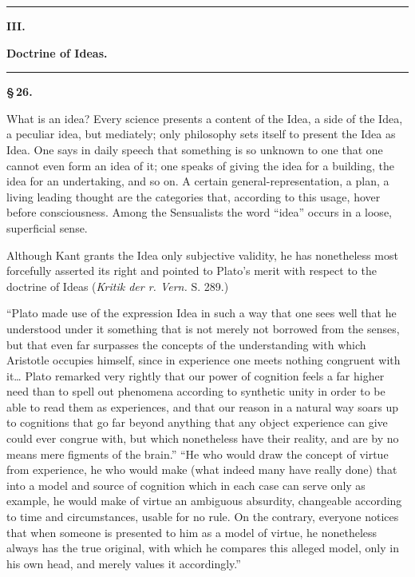 \documentclass[12pt]{book}
\begin{document}
\begin{center}\rule{0.35\linewidth}{0.4pt}\end{center}
\begin{center}
  {\large\bfseries III.}\par\vspace{4pt}
  {\Large\bfseries Doctrine of Ideas.}\par\vspace{4pt}
  \rule{2.5cm}{0.4pt}
\end{center}
{}

\begin{center}{\bfseries \S\,26.}\end{center}

What is an idea? Every science presents a content of the Idea, a side of the Idea, a peculiar
idea, but mediately; only philosophy sets itself to present the Idea as Idea. One says in daily
speech that something is so unknown to one that one cannot even form an idea of it; one speaks of
giving the idea for a building, the idea for an undertaking, and so on. A certain
general-representation, a plan, a living leading thought are the categories that, according to
this usage, hover before consciousness. Among the Sensualists the word ``idea'' occurs in a loose,
superficial sense.

Although Kant grants the Idea only subjective validity, he has nonetheless most forcefully
asserted its right and pointed to Plato's merit with respect to the doctrine of Ideas
(\textit{Kritik der r. Vern.} S. 289.)

``Plato made use of the expression Idea in such a way that one sees well that he understood under
it something that is not merely not borrowed from the senses, but that even far surpasses the
concepts of the understanding with which Aristotle occupies himself, since in experience one
meets nothing congruent with it\ldots{} Plato remarked very rightly that our power of cognition
feels a far higher need than to spell out phenomena according to synthetic unity in order to be
able to read them as experiences, and that our reason in a natural way soars up to cognitions that
go far beyond anything that any object experience can give could ever congrue with, but which
nonetheless have their reality, and are by no means mere figments of the brain.''
``He who would draw the concept of virtue from experience, he who would make (what indeed many
have really done) that into a model and source of cognition which in each case can serve only as
example, he would make of virtue an ambiguous absurdity, changeable according to time and
circumstances, usable for no rule. On the contrary, everyone notices that when someone is presented
to him as a model of virtue, he nonetheless always has the true original, with which he compares
this alleged model, only in his own head, and merely values it accordingly.''
\end{document}
